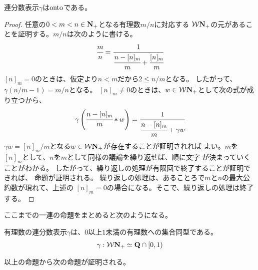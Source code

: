 	\begin{proposition}[連分数表示はonto]\label{prop:連分数表示はonto} %
		連分数表示$\gamma$は${\operatorname{onto}}$である。
	\end{proposition} %
	\begin{proof} 任意の$0<m<n\in\mathbf{N}_+$となる有理数$m/n$に対応する
	${{\mathcal{W}}}\mathbf{N}_+$の元があることを証明する。$m/n$は次のように書ける。
	\begin{equation*}\begin{split}
		\cfrac{m}{n} = \cfrac{1}{\cfrac{n-[n]_m}{m} + \cfrac{[n]_m}{m}}
	\end{split}\end{equation*}
	$[n]_m=0$のときは、仮定より$n<m$だから$2\le n/m$となる。
	したがって、$\gamma(n/m-1)=m/n$となる。
	$[n]_m\neq0$のときは、$w\in{\ensuremath{{\mathcal{W}}}}\mathbf{N}_+$として次の式が成り立つから、
	\begin{equation*}\begin{split}
		\gamma\left(\cfrac{n-[n]_m}{m}*w\right)
		= \cfrac{1}{\cfrac{n-[n]_m}{m} + \gamma w}
	\end{split}\end{equation*}
	$\gamma w=[n]_m/m$となる$w\in{\ensuremath{{\mathcal{W}}}}\mathbf{N}_+$が存在することが証明されれば
	よい。$m$を$[n]_m$として、$n$を$m$として同様の議論を繰り返せば、順に文字
	が決まっていくことがわかる。
	したがって、繰り返しの処理が有限回で終了することが証明できれば、
	命題が証明される。
	繰り返しの処理は、あることろで$m$と$n$の最大公約数が現れて、上述の
	$[n]_m=0$の場合になる。そこで、繰り返しの処理は終了する。
	\end{proof}

	ここまでの一連の命題をまとめると次のようになる。

	\begin{proposition}[連分数表示]\label{prop:連分数表示} %
		有理数の連分数表示$\gamma$は、$0$以上$1$未満の有理数への集合同型である。
		\begin{equation*}\begin{split}
			\gamma: {{\mathcal{W}}}\mathbf{N}_+\simeq \mathbf{Q}\cap[0,1) \\
		\end{split}\end{equation*}
	\end{proposition} %

	以上の命題から次の命題が証明される。

